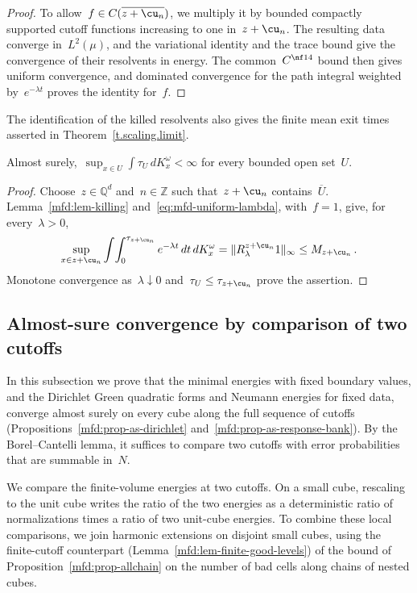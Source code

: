 \documentclass[11pt]{amsart}
\begin{document}
\begin{proof}
\smallskip

To allow~$f\in C(\overline{z+\cu_n})$, we multiply it by bounded compactly supported cutoff functions increasing to one in~$z+\cu_n$. The resulting data converge in~$L^2(\mu)$, and the variational identity and the trace bound give the convergence of their resolvents in energy. The common~$C^{\nf14}$ bound then gives uniform convergence, and dominated convergence for the path integral weighted by~$e^{-\lambda t}$ proves the identity for~$f$.
\end{proof}

The identification of the killed resolvents also gives the finite mean exit times asserted in Theorem~\ref{t.scaling.limit}.

\begin{corollary}
\label{mfd:cor-finite-exit}
Almost surely,~$\sup_{x\in U}\int\tau_U\,dK^\omega_x<\infty$ for every bounded open set~$U$.
\end{corollary}
\begin{proof}
Choose~$z\in\mathbb Q^d$ and~$n\in\mathbb Z$ such that~$z+\cu_n$ contains~$\overline U$. Lemma~\ref{mfd:lem-killing} and~\eqref{eq:mfd-uniform-lambda}, with~$f=1$, give, for every~$\lambda>0$,
\begin{equation*}
	\sup_{x\in z+\cu_n}\int\!\int_0^{\tau_{z+\cu_n}}e^{-\lambda t}\,dt\,dK^\omega_x
	=\|R^{z+\cu_n}_\lambda1\|_\infty\leq M_{z+\cu_n}
	\,.
\end{equation*}
Monotone convergence as~$\lambda\downarrow0$ and~$\tau_U\leq\tau_{z+\cu_n}$ prove the assertion.
\end{proof}

\subsection{Almost-sure convergence by comparison of two cutoffs}
\label{mfd:sec-finite-comparison}

In this subsection we prove that the minimal energies with fixed boundary values, and the Dirichlet Green quadratic forms and Neumann energies for fixed data, converge almost surely on every cube along the full sequence of cutoffs (Propositions~\ref{mfd:prop-as-dirichlet} and~\ref{mfd:prop-as-response-bank}). By the Borel--Cantelli lemma, it suffices to compare two cutoffs with error probabilities that are summable in~$N$.

\smallskip

We compare the finite-volume energies at two cutoffs. On a small cube, rescaling to the unit cube writes the ratio of the two energies as a deterministic ratio of normalizations times a ratio of two unit-cube energies. To combine these local comparisons, we join harmonic extensions on disjoint small cubes, using the finite-cutoff counterpart (Lemma~\ref{mfd:lem-finite-good-levels}) of the bound of Proposition~\ref{mfd:prop-allchain} on the number of bad cells along chains of nested cubes.
\end{document}
